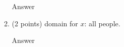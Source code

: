 \documentclass{article}
\begin{document}
\begin{enumerate}
\begin{enumerate}
        \color{blue}
            Answer
        \color{black}
        
        \item (2 points) domain for $x$: all people.
    
        \color{blue}
            Answer
        \color{black}
    \end{enumerate}
\end{enumerate}
\end{document}
